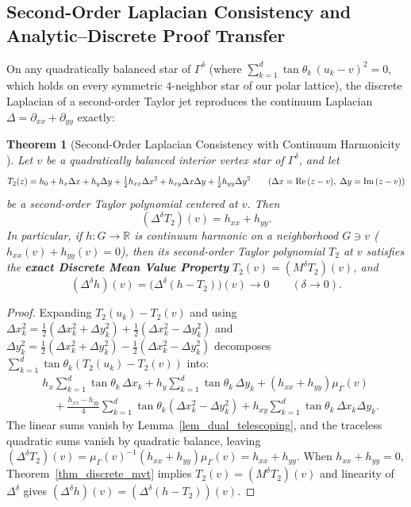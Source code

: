\documentclass[11pt,reqno]{amsart}
\newtheorem{thm}{Theorem}[section]
\numberwithin{equation}{section}
\newcommand{\R}{\mathbb{R}}
\newcommand{\re}{\mbox{\rm Re\,}}
\newcommand{\im}{\mbox{\rm Im\,}}
\begin{document}
\subsection{Second-Order Laplacian Consistency and Analytic--Discrete Proof Transfer}

On any quadratically balanced star of $\varGamma^{\delta}$ (where $\sum_{k=1}^d \tan\theta_k\,(u_k - v)^2 = 0$, which holds on every symmetric $4$-neighbor star of our polar lattice), the discrete Laplacian of a second-order Taylor jet reproduces the continuum Laplacian $\Delta = \partial_{xx} + \partial_{yy}$ exactly:

\begin{thm}[Second-Order Laplacian Consistency with Continuum Harmonicity {\cite[Lemma~2.2]{CS}}] \label{thm_taylor_consistency}
Let $v$ be a quadratically balanced interior vertex star of $\varGamma^{\delta}$, and let
\[
  T_2(z) = h_0 + h_x \Delta x + h_y \Delta y + \tfrac{1}{2} h_{xx} \Delta x^2 + h_{xy} \Delta x \Delta y + \tfrac{1}{2} h_{yy} \Delta y^2 \qquad (\Delta x = \re(z-v),\; \Delta y = \im(z-v))
\]
be a second-order Taylor polynomial centered at $v$. Then
\begin{equation} \label{eq_lap_taylor}
  (\Delta^{\delta} T_2)(v) = h_{xx} + h_{yy}.
\end{equation}
In particular, if $h : G \to \R$ is continuum harmonic on a neighborhood $G \ni v$ ($h_{xx}(v) + h_{yy}(v) = 0$), then its second-order Taylor polynomial $T_2$ at $v$ satisfies the \textbf{exact Discrete Mean Value Property} $T_2(v) = (M^{\delta} T_2)(v)$, and
\begin{equation} \label{eq_lap_remainder}
  (\Delta^{\delta} h)(v) = \bigl(\Delta^{\delta}(h - T_2)\bigr)(v) \longrightarrow 0 \qquad (\delta \to 0).
\end{equation}
\end{thm}
\begin{proof}
Expanding $T_2(u_k) - T_2(v)$ and using $\Delta x_k^2 = \frac{1}{2}(\Delta x_k^2 + \Delta y_k^2) + \frac{1}{2}(\Delta x_k^2 - \Delta y_k^2)$ and $\Delta y_k^2 = \frac{1}{2}(\Delta x_k^2 + \Delta y_k^2) - \frac{1}{2}(\Delta x_k^2 - \Delta y_k^2)$ decomposes $\sum_{k=1}^d \tan\theta_k(T_2(u_k) - T_2(v))$ into:
\begin{align*}
  &h_x \sum_{k=1}^d \tan\theta_k\,\Delta x_k + h_y \sum_{k=1}^d \tan\theta_k\,\Delta y_k + (h_{xx} + h_{yy})\mu_{\varGamma}(v) \\
  &\quad + \frac{h_{xx} - h_{yy}}{4}\sum_{k=1}^d \tan\theta_k(\Delta x_k^2 - \Delta y_k^2) + h_{xy}\sum_{k=1}^d \tan\theta_k\,\Delta x_k \Delta y_k.
\end{align*}
The linear sums vanish by Lemma~\ref{lem_dual_telescoping}, and the traceless quadratic sums vanish by quadratic balance, leaving $(\Delta^{\delta} T_2)(v) = \mu_{\varGamma}(v)^{-1}(h_{xx} + h_{yy})\mu_{\varGamma}(v) = h_{xx} + h_{yy}$. When $h_{xx} + h_{yy} = 0$, Theorem~\ref{thm_discrete_mvt} implies $T_2(v) = (M^{\delta} T_2)(v)$ and linearity of $\Delta^{\delta}$ gives $(\Delta^{\delta} h)(v) = (\Delta^{\delta}(h - T_2))(v)$.
\end{proof}
\end{document}
